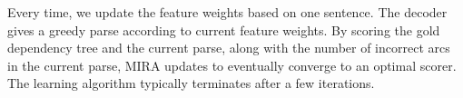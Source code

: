 Every time, we update the feature weights based on one sentence. The
decoder gives a greedy parse according to current feature weights.
By scoring the gold dependency tree and the current parse,
along with the number of incorrect arcs in the current parse,
MIRA updates to eventually converge to an optimal scorer.
The learning algorithm typically terminates after a few iterations.
